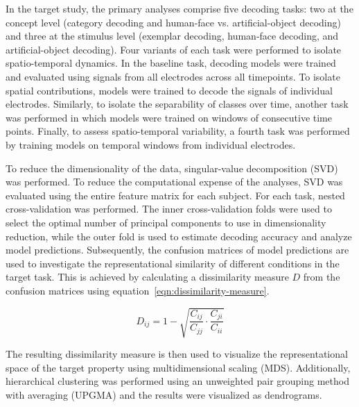 In the target study, the primary analyses comprise five decoding tasks: two at the concept level (category decoding and human-face vs. artificial-object decoding) and three at the stimulus level (exemplar decoding, human-face decoding, and artificial-object decoding). Four variants of each task were performed to isolate spatio-temporal dynamics. In the baseline task, decoding models were trained and evaluated using signals from all electrodes across all timepoints. To isolate spatial contributions, models were trained to decode the signals of individual electrodes. Similarly, to isolate the separability of classes over time, another task was performed in which models were trained on windows of consecutive time points. Finally, to assess spatio-temporal variability, a fourth task was performed by training models on temporal windows from individual electrodes.

 To reduce the dimensionality of the data, singular-value decomposition (SVD) was performed. To reduce the computational expense of the analyses, SVD was evaluated using the entire feature matrix for each subject. For each task, nested cross-validation was performed. The inner cross-validation folds were used to select the optimal number of principal components to use in dimensionality reduction, while the outer fold is used to estimate decoding accuracy and analyze model predictions. Subsequently, the confusion matrices of model predictions are used to investigate the representational similarity of different conditions in the target task. This is achieved by calculating a dissimilarity measure $D$ from the confusion matrices using equation~\ref{eqn:dissimilarity-measure}.

\begin{equation}
    D_{ij} = 1 - \sqrt{\frac{C_{ij}}{C_{jj}}\cdot \frac{C_{ji}}{C_{ii}}} \label{eqn:dissimilarity-measure}
\end{equation}

The resulting dissimilarity measure is then used to visualize the representational space of the target property using multidimensional scaling (MDS). Additionally, hierarchical clustering was performed using an unweighted pair grouping method with averaging (UPGMA) and the results were visualized as dendrograms. 

